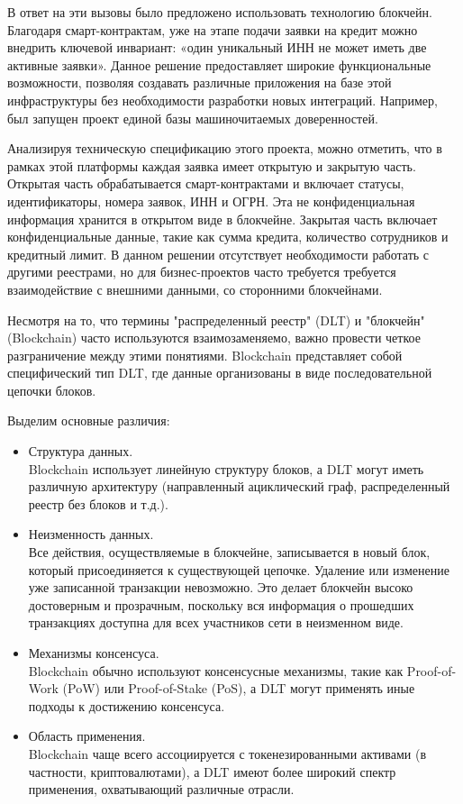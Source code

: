 В ответ на эти вызовы было предложено использовать технологию блокчейн. Благодаря смарт-контрактам, уже на этапе подачи заявки на кредит можно внедрить ключевой инвариант: «один уникальный ИНН не может иметь две активные заявки». Данное решение предоставляет широкие функциональные возможности, позволяя создавать различные приложения на базе этой инфраструктуры без необходимости разработки новых интеграций. Например, был запущен проект единой базы машиночитаемых доверенностей\cite{label15}.

Анализируя техническую спецификацию этого проекта\cite{label17}, можно отметить, что в рамках этой платформы каждая заявка имеет открытую и закрытую часть. Открытая часть обрабатывается смарт-контрактами и включает статусы, идентификаторы, номера заявок, ИНН и ОГРН. Эта не конфиденциальная информация хранится в открытом виде в блокчейне. Закрытая часть включает конфиденциальные данные, такие как сумма кредита, количество сотрудников и кредитный лимит. В данном решении отсутствует необходимости работать с другими реестрами, но для бизнес-проектов часто требуется требуется взаимодействие с внешними данными, со сторонними блокчейнами.

Несмотря на то, что термины "распределенный реестр" (DLT) и "блокчейн" (Blockchain) часто используются взаимозаменяемо, важно провести четкое разграничение между этими понятиями. Blockchain представляет собой специфический тип DLT, где данные организованы в виде последовательной цепочки блоков.

Выделим основные различия:
\begin{itemize}[]
	\item Структура данных.\\
	Blockchain использует линейную структуру блоков, а DLT могут иметь различную архитектуру (направленный ациклический граф, распределенный реестр без блоков и т.д.).

	\item Неизменность данных.\\
	Все действия, осуществляемые в блокчейне, записывается в новый блок, который присоединяется к существующей цепочке. Удаление или изменение уже записанной транзакции невозможно. Это делает блокчейн высоко достоверным и прозрачным, поскольку вся информация о прошедших транзакциях доступна для всех участников сети в неизменном виде.

	\item Механизмы консенсуса.\\
	Blockchain обычно используют консенсусные механизмы, такие как Proof-of-Work (PoW) или Proof-of-Stake (PoS), а DLT могут применять иные подходы к достижению консенсуса.

	\item Область применения.\\
	Blockchain чаще всего ассоциируется с токенезированными активами (в частности, криптовалютами), а DLT имеют более широкий спектр применения, охватывающий различные отрасли.
\end{itemize}

